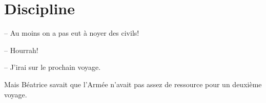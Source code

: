 \chapter{Discipline}


-- Au moins on a pas eut à noyer des civils!

-- Hourrah!

\sautSection{}


-- J'irai sur le prochain voyage. 

Mais Béatrice savait que l'Armée n'avait pas assez de ressource pour un deuxième voyage.

